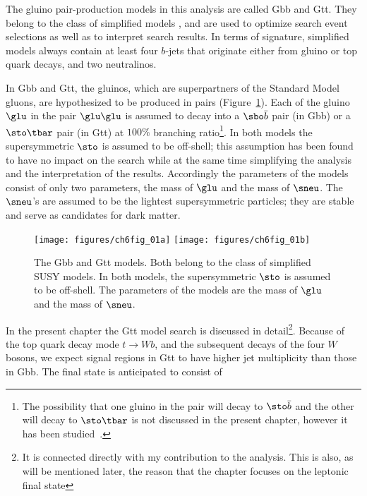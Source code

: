 The gluino pair-production models in this analysis are called Gbb and Gtt. They
belong to the class of simplified models \cite{Alwall:2008ag,Alves:2011wf}, and
are used to optimize search event selections as well as to interpret search
results. In terms of signature, simplified models always contain at least four
$b$-jets that originate either from gluino or top quark decays, and two
neutralinos.

In Gbb and Gtt, the gluinos, which are superpartners of the Standard Model
gluons, are hypothesized to be produced in pairs (Figure~\ref{f:gttfey}). Each
of the gluino $\glu$ in the pair $\glu\glu$ is assumed to decay into a
$\sbo\bar{b}$ pair (in Gbb) or a $\sto\tbar$ pair (in Gtt) at $100\%$ branching
ratio\footnote{The possibility that one gluino in the pair will decay to
$\sto\bar{b}$ and the other will decay to $\sto\tbar$ is not discussed in the
present chapter, however it has been studied~\cite{multibnew}.}. In both models
the supersymmetric $\sto$ is assumed to be off-shell; this assumption has been
found to have no impact on the search while at the same time simplifying the
analysis and the interpretation of the results. Accordingly the parameters of
the models consist of only two parameters, the mass of $\glu$ and the mass of
$\sneu$. The $\sneu$'s are assumed to be the lightest supersymmetric particles;
they are stable and serve as candidates for dark matter.

\begin{figure}[H]
	\texttt{[image: figures/ch6fig\_01a]}
	\texttt{[image: figures/ch6fig\_01b]}
	\centering

	\caption{The Gbb and Gtt models. Both belong to the class of simplified SUSY
		models. In both models, the supersymmetric $\sto$ is assumed to be off-shell.
		The parameters of the models are the mass of $\glu$ and the mass of $\sneu$.}

	\label{f:gttfey}
\end{figure}

In the present chapter the Gtt model search is discussed in detail\footnote{It
is connected directly with my contribution to the analysis. This is also, as
will be mentioned later, the reason that the chapter focuses on the leptonic
final state}. Because of the top quark decay mode $t\to Wb$, and the subsequent
decays of the four $W$ bosons, we expect signal regions in Gtt to have higher jet
multiplicity than those in Gbb. The final state is anticipated to consist of


